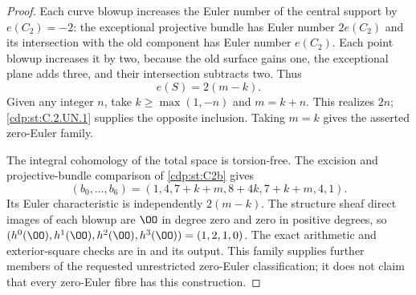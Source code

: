\begin{proof}
Each curve blowup increases the Euler number of the central
support by $e(C_2)=-2$: the exceptional projective bundle has Euler
number $2e(C_2)$ and its intersection with the old component has
Euler number $e(C_2)$. Each point blowup increases it by two,
because the old surface gains one, the exceptional plane adds
three, and their intersection subtracts two. Thus
\[
                         e(S)=2(m-k).                 \tag{C.UN.5}\label{cdp:eq:C.UN.5}
\]
Given any integer $n$, take $k\ge\max(1,-n)$ and $m=k+n$.
This realizes $2n$; \ref{cdp:st:C.2.UN.1} supplies the opposite inclusion.
Taking $m=k$ gives the asserted zero-Euler family.

The integral cohomology of the total space is torsion-free. The
excision and projective-bundle comparison of \ref{cdp:st:C2b} gives
\[
 (b_0,\ldots,b_6)
      =(1,4,7+k+m,8+4k,7+k+m,4,1).                  \tag{C.UN.6}\label{cdp:eq:C.UN.6}
\]
Its Euler characteristic is independently $2(m-k)$. The structure
sheaf direct images of each blowup are $\OO$ in degree zero and
zero in positive degrees, so
$(h^0(\OO),h^1(\OO),h^2(\OO),h^3(\OO))=(1,2,1,0)$.
The exact arithmetic and exterior-square checks are in
 and its output.
This family supplies further members of the requested unrestricted
zero-Euler classification; it does not claim that every zero-Euler
fibre has this construction.
\end{proof}


